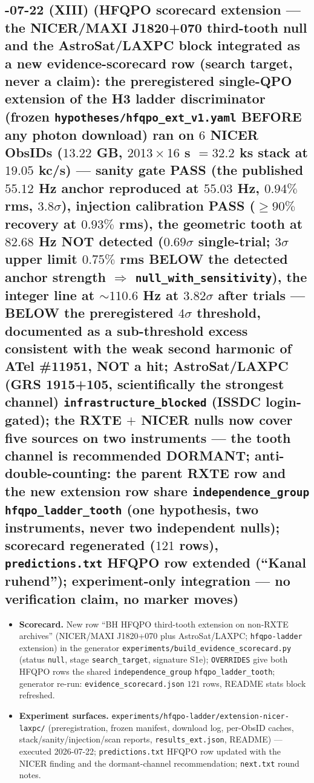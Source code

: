 \documentclass[11pt]{article}
\begin{document}
\subsection*{-07-22 (XIII) (HFQPO scorecard extension --- the NICER/MAXI J1820+070 third-tooth null and the AstroSat/LAXPC block integrated as a new evidence-scorecard row (search target, never a claim): the preregistered single-QPO extension of the H3 ladder discriminator (frozen \texttt{hypotheses/hfqpo\_ext\_v1.yaml} BEFORE any photon download) ran on $6$ NICER ObsIDs ($13.22$ GB, $2013\times16$ s $=32.2$ ks stack at $19.05$ kc/s) --- sanity gate PASS (the published $55.12$ Hz anchor reproduced at $55.03$ Hz, $0.94\%$ rms, $3.8\sigma$), injection calibration PASS ($\ge90\%$ recovery at $0.93\%$ rms), the geometric tooth at $82.68$ Hz NOT detected ($0.69\sigma$ single-trial; $3\sigma$ upper limit $0.75\%$ rms BELOW the detected anchor strength $\Rightarrow$ \texttt{null\_with\_sensitivity}), the integer line at $\sim110.6$ Hz at $3.82\sigma$ after trials --- BELOW the preregistered $4\sigma$ threshold, documented as a sub-threshold excess consistent with the weak second harmonic of ATel \#11951, NOT a hit; AstroSat/LAXPC (GRS 1915+105, scientifically the strongest channel) \texttt{infrastructure\_blocked} (ISSDC login-gated); the RXTE $+$ NICER nulls now cover five sources on two instruments --- the tooth channel is recommended DORMANT; anti-double-counting: the parent RXTE row and the new extension row share \texttt{independence\_group} \texttt{hfqpo\_ladder\_tooth} (one hypothesis, two instruments, never two independent nulls); scorecard regenerated ($121$ rows), \texttt{predictions.txt} HFQPO row extended (``Kanal ruhend''); experiment-only integration --- no verification claim, no marker moves)}
\begin{itemize}[leftmargin=1.5em]
\item \textbf{Scorecard.} New row ``BH HFQPO third-tooth extension on non-RXTE archives''
(NICER/MAXI J1820+070 plus AstroSat/LAXPC; \texttt{hfqpo-ladder} extension) in the generator
\texttt{experiments/build\_evidence\_scorecard.py} (status \texttt{null}, stage
\texttt{search\_target}, signature S1e); \texttt{OVERRIDES} give both HFQPO rows the shared
\texttt{independence\_group} \texttt{hfqpo\_ladder\_tooth}; generator re-run:
\texttt{evidence\_scorecard.json} $121$ rows, README stats block refreshed.
\item \textbf{Experiment surfaces.} \texttt{experiments/hfqpo-ladder/extension-nicer-laxpc/}
(preregistration, frozen manifest, download log, per-ObsID caches, stack/sanity/injection/scan
reports, \texttt{results\_ext.json}, README) --- executed 2026-07-22; \texttt{predictions.txt}
HFQPO row updated with the NICER finding and the dormant-channel recommendation;
\texttt{next.txt} round notes.
\end{itemize}
\end{document}
